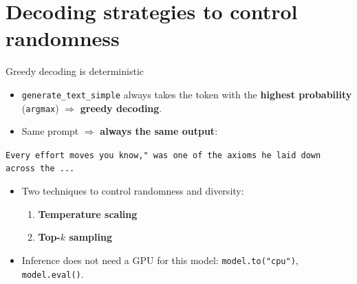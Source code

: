 \documentclass[aspectratio=169]{beamer}
\begin{document}
	\section{Decoding strategies to control randomness}


	\begin{frame}{Greedy decoding is deterministic}
		\begin{itemize}
			\item \texttt{generate\_text\_simple} always takes the token with the \textbf{highest probability} (\texttt{argmax}) $\Rightarrow$ \textbf{greedy decoding}.
			\item Same prompt $\Rightarrow$ \textbf{always the same output}:
		\end{itemize}
		\begin{center}
			\small\texttt{Every effort moves you know," was one of the axioms he laid down across the ...}
		\end{center}
		\begin{itemize}
			\item Two techniques to control randomness and diversity:
			\begin{enumerate}
				\item \textbf{Temperature scaling}
				\item \textbf{Top-$k$ sampling}
			\end{enumerate}
			\item Inference does not need a GPU for this model: \texttt{model.to("cpu")}, \texttt{model.eval()}.
		\end{itemize}
	\end{frame}
\end{document}
